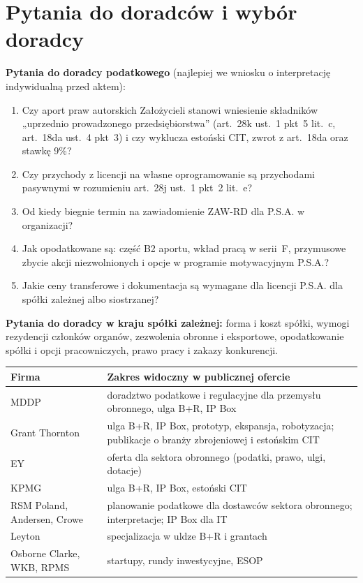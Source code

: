 \documentclass[11pt,a4paper]{report}
\begin{document}
\section{Pytania do doradców i wybór doradcy}

\textbf{Pytania do doradcy podatkowego} (najlepiej we wniosku o interpretację indywidualną przed aktem):
\begin{enumerate}
  \item Czy aport praw autorskich Założycieli stanowi wniesienie składników „uprzednio prowadzonego przedsiębiorstwa” (art.~28k ust.~1 pkt~5 lit.~c, art.~18da ust.~4 pkt~3) i czy wyklucza estoński CIT, zwrot z art.~18da oraz stawkę 9\%?
  \item Czy przychody z licencji na własne oprogramowanie są przychodami pasywnymi w rozumieniu art.~28j ust.~1 pkt~2 lit.~e?
  \item Od kiedy biegnie termin na zawiadomienie ZAW-RD dla P.S.A. w organizacji?
  \item Jak opodatkowane są: część B2 aportu, wkład pracą w serii~F, przymusowe zbycie akcji niezwolnionych i opcje w programie motywacyjnym P.S.A.?
  \item Jakie ceny transferowe i dokumentacja są wymagane dla licencji P.S.A. dla spółki zależnej albo siostrzanej?
\end{enumerate}

\textbf{Pytania do doradcy w kraju spółki zależnej:} forma i koszt spółki, wymogi rezydencji członków organów, zezwolenia obronne i eksportowe, opodatkowanie spółki i opcji pracowniczych, prawo pracy i zakazy konkurencji.

\begin{center}
\small
\begin{tabularx}{\linewidth}{@{}>{\raggedright\arraybackslash}p{3.6cm} X@{}}
\toprule
\textbf{Firma} & \textbf{Zakres widoczny w publicznej ofercie} \\
\midrule
MDDP & doradztwo podatkowe i regulacyjne dla przemysłu obronnego, ulga B+R, IP Box \\
Grant Thornton & ulga B+R, IP Box, prototyp, ekspansja, robotyzacja; publikacje o branży zbrojeniowej i estońskim CIT \\
EY & oferta dla sektora obronnego (podatki, prawo, ulgi, dotacje) \\
KPMG & ulga B+R, IP Box, estoński CIT \\
RSM Poland, Andersen, Crowe & planowanie podatkowe dla dostawców sektora obronnego; interpretacje; IP Box dla IT \\
Leyton & specjalizacja w uldze B+R i grantach \\
Osborne Clarke, WKB, RPMS & startupy, rundy inwestycyjne, ESOP \\
\bottomrule
\end{tabularx}
\end{center}
\end{document}
